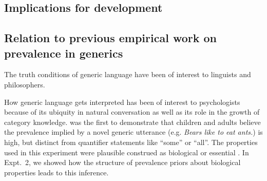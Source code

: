 \documentclass[12pt,letterpaper]{article}
\begin{document}



\subsection*{Implications for development}

\subsection*{Relation to previous empirical work on prevalence in generics}

The truth conditions of generic language have been of interest to linguists and philosophers. 


How generic language gets interpreted has been of interest to psychologists because of its ubiquity in natural conversation as well as its role in the growth of category knowledge. 
 was the first to demonstrate that children and adults believe the prevalence implied by a novel generic utterance (e.g. \emph{Bears like to eat ants.}) is high, but distinct from quantifier statements like ``some'' or ``all''. 
The properties used in this experiment were plausible construed as biological or essential \cite{Gelman2003}.
In Expt.~2, we showed how the structure of prevalence priors about biological properties leads to this inference.  
\end{document}
